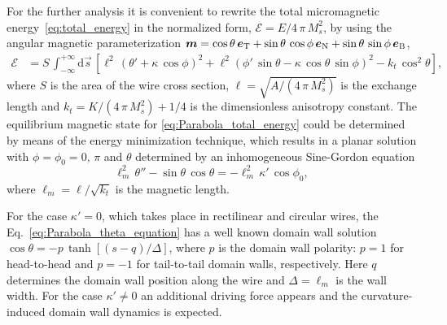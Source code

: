 For the further analysis it is convenient to rewrite the total micromagnetic energy~\eqref{eq:total_energy} in the normalized form, $\mathcal{E} = E/4 \, \pi \, M_s^2$, by using the angular magnetic parameterization $\vec{m} = \cos\theta \, \vec{e}_{\textrm{T}}+\sin\theta \, \cos\phi \, \vec{e}_{\textrm{N}} + \sin\theta \, \sin \phi \, \vec{e}_{\textsc{B}}$, 
\begin{equation}\label{eq:Parabola_total_energy}
	\begin{split}
		\mathcal{E} &= S \, \int^{+ \infty}_{-\infty}\mathrm{d}\vec{s} \, \left[\ell^2 \, (\theta' + \kappa \, \cos \phi)^2 + \ell^2 (\phi' \, \sin \theta  - \kappa \, \cos \theta \, \sin \phi)^2 -k_t \, \cos^2 \theta \right],
	\end{split}
\end{equation}
where $S$ is the area of the wire cross section, $\ell = \sqrt{A/(4 \, \pi \, M^2_s)}$ is the exchange length and $k_t = K/(4 \, \pi \, M^2_s) + 1/4$ is the dimensionless anisotropy constant. The equilibrium magnetic state for \eqref{eq:Parabola_total_energy} could be determined by means of the energy minimization technique, which results in a planar solution with $\phi = \phi_0 = 0, \, \pi$ and $\theta$ determined by an inhomogeneous Sine-Gordon equation 
\begin{equation} \label{eq:Parabola_theta_equation}
	\ell^2_m \, \theta'' - \sin \theta \, \cos \theta = - \ell^2_m \, \kappa' \, \cos \phi_0,
\end{equation}
where $\ell_m = \ell/\sqrt{k_t}$ is the magnetic length.

For the case $\kappa' = 0$, which takes place in rectilinear and circular wires, the Eq.~\eqref{eq:Parabola_theta_equation} has a well known domain wall solution $\cos \theta = - p \, \tanh[(s-q)/\Delta]$, where $p$ is the domain wall polarity: $p=1$ for head-to-head and $p=-1$ for tail-to-tail domain walls, respectively. Here $q$ determines the domain wall position along the wire and $\Delta = \ell_m$ is the wall width. For the case $\kappa' \neq 0$ an additional driving force appears and the curvature-induced domain wall dynamics is expected. 

